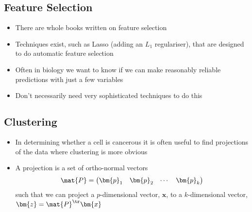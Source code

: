 
\begin{slide}
\section{Feature Selection}

\begin{PauseHighLight}
  \begin{itemize}
  \item There are whole books written on feature selection\pause
  \item Techniques exist, such as Lasso (adding an $L_1$ regulariser),
    that are designed to do automatic feature selection\pause
  \item Often in biology we want to know if we can make reasonably
    reliable predictions with just a few variables\pause
  \item Don't necessarily need very sophisticated techniques to do
    this\pause
  \end{itemize}
\end{PauseHighLight}

\end{slide}


\Outline %

\begin{slide}
\section{Clustering}

\begin{PauseHighLight}
  \begin{itemize}
  \item In determining whether a cell is cancerous it is often useful to
    find projections of the data where clustering is more obvious\pause
  \item A projection is a set of ortho-normal vectors
    \begin{align*}
      \mat{P} =
      \begin{pmatrix}
        \bm{p}_1 & \bm{p}_2 & \cdots & \bm{p}_k
      \end{pmatrix}
    \end{align*}
    such that we can project a $p$-dimensional vector, $\bm{x}$, to a
    $k$-dimensional vector, $\bm{z} = \mat{P}^\tr \bm{x}$\pause
  \end{itemize}
\end{PauseHighLight}

\end{slide}

